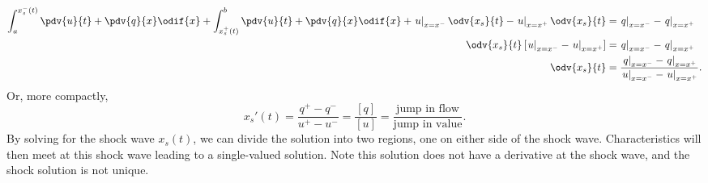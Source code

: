 \documentclass{article}
\theoremstyle{definition}
\begin{document}
\begin{align*}
    \int_a^{x_s^{-}\left( t \right)} \pdv{u}{t} + \pdv{q}{x} \odif{x} + \int_{x_s^{+}\left( t \right)}^b \pdv{u}{t} + \pdv{q}{x} \odif{x} + \left. u \right|_{x = x^{-}} \odv{x_s}{t} - \left. u \right|_{x = x^{+}} \odv{x_s}{t} & = \left. q \right|_{x = x^{-}} - \left. q \right|_{x = x^{+}}                                                                      \\
    \odv{x_s}{t} \left[ \left. u \right|_{x = x^{-}} - \left. u \right|_{x = x^{+}} \right]                                                                                                                                       & = \left. q \right|_{x = x^{-}} - \left. q \right|_{x = x^{+}}                                                                      \\
    \odv{x_s}{t}                                                                                                                                                                                                                  & = \frac{\left. q \right|_{x = x^{-}} - \left. q \right|_{x = x^{+}}}{\left. u \right|_{x = x^{-}} - \left. u \right|_{x = x^{+}}}.
\end{align*}
Or, more compactly,
\begin{equation*}
    x_s'\left( t \right) = \frac{q^+ - q^-}{u^+ - u^-} = \frac{\left[ q \right]}{\left[ u \right]} = \frac{\text{jump in flow}}{\text{jump in value}}.
\end{equation*}
By solving for the shock wave \(x_s\left( t \right)\), we can divide
the solution into two regions, one on either side of the shock wave.
Characteristics will then meet at this shock wave leading to a
single-valued solution. Note this solution does not have a derivative at
the shock wave, and the shock solution is not unique.
\end{document}
